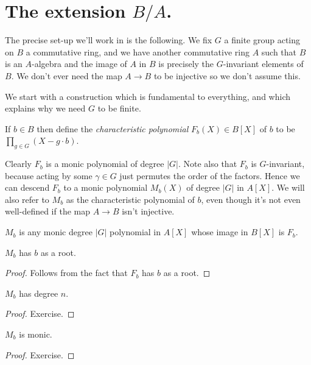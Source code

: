 \section{The extension $B/A$.}

The precise set-up we'll work in is the following. We fix $G$ a finite group acting
on $B$ a commutative ring, and we have another commutative ring $A$ such
that $B$ is an $A$-algebra and the image of $A$ in $B$ is precisely the $G$-invariant
elements of $B$. We don't ever need the map $A\to B$ to be injective so we don't assume this.

We start with a construction which is fundamental to everything,
and which explains why we need $G$ to be finite.

\begin{definition}
  \label{MulSemiringAction.CharacteristicPolynomial.F}
  \leanok
  If $b\in B$ then define the \emph{characteristic polynomial}
  $F_b(X) \in B[X]$ of $b$ to be $\prod_{g\in G}(X-g\cdot b)$.
\end{definition}

Clearly $F_b$ is a monic polynomial of degree $|G|$. Note also
that $F_b$ is $G$-invariant, because acting by some $\gamma\in G$
just permutes the order of the factors. Hence we can descend $F_b$
to a monic polynomial $M_b(X)$ of degree $|G|$ in $A[X]$. We will
also refer to $M_b$ as the characteristic polynomial of $b$, even though
it's not even well-defined if the map $A\to B$ isn't injective.

\begin{definition}
  \label{MulSemiringAction.CharacteristicPolynomial.M}
  \leanok
  $M_b$ is any monic degree $|G|$ polynomial in $A[X]$ whose
  image in $B[X]$ is $F_b$.
\end{definition}

\begin{lemma}
  \label{MulSemiringAction.CharacteristicPolynomial.M_eval_eq_zero}
  $M_b$ has $b$ as a root.
\end{lemma}
\begin{proof} Follows from the fact that $F_b$ has $b$ as a root.
\end{proof}
\begin{lemma}
  \label{MulSemiringAction.CharacteristicPolynomial.M_deg}
  $M_b$ has degree $n$.
\end{lemma}
\begin{proof} Exercise.
\end{proof}
\begin{lemma}
  \label{MulSemiringAction.CharacteristicPolynomial.M_monic}
  $M_b$ is monic.
\end{lemma}
\begin{proof}
  Exercise.
\end{proof}

